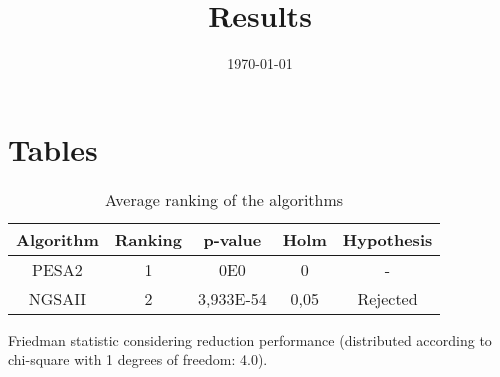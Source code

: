\documentclass{article}
\title{Results}
\author{}
\date{\today}
\begin{document}
\oddsidemargin 0in \topmargin 0in\maketitle

\section{Tables}
\begin{table}[!htp]
\centering
\begin{tabular}{c|c|c|c|c}
Algorithm&Ranking&p-value&Holm&Hypothesis\\
\hline
PESA2 & 1 & 0E0 & 0 & -\\
NGSAII & 2 & 3,933E-54 & 0,05 & Rejected\\
\end{tabular}
\caption{Average ranking of the algorithms}
\end{table}


Friedman statistic considering reduction performance (distributed according to chi-square with 1 degrees of freedom: 4.0).
\end{document}
